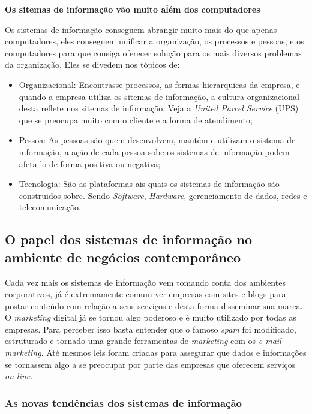 \documentclass[
	12pt,				%
	openany,			%
	a4paper,			%
	chapter=TITLE,		%
	section=TITLE,		%
	english,
	brazil				%
]{abntex2}
\begin{document}
\textbf{Os sitemas de informação vão muito aĺém dos computadores}

Os sistemas de informação conseguem abrangir muito mais do que apenas computadores, eles conseguem unificar a organização, os processos e pessoas, e os computadores para que consiga oferecer solução para os mais diversos problemas da organização.
Eles se divedem nos tópicos de:
	\begin{itemize}
		\item Organizacional: Encontrasse processos, as formas hierarquicas da empresa, e quando a empresa utiliza os sitemas de informação, a cultura organizacional desta reflete nos sitemas de informação. Veja a \textit{United Parcel Service} (UPS) que se preocupa muito com o cliente e a forma de atendimento;
		\item Pessoa: As pessoas são quem desenvolvem, mantém e utilizam o sistema de informação, a ação de cada pessoa sobe os sistemas de informação podem afeta-lo de forma positiva ou negativa;
		\item Tecnologia: São as plataformas ais quais os sistemas de informação são construidos sobre. Sendo \textit{Software}, \textit{Hardware}, gerenciamento de dados, redes e telecomunicação.
	\end{itemize}

\subsection{O papel dos sistemas de informação no ambiente de negócios contemporâneo}

Cada vez mais os sistemas de informação vem tomando conta dos ambientes corporativos, já é extremamente comum ver empresas com sites e blogs para postar conteúdo com relação a seus serviços e desta forma disseminar sua marca. O \textit{marketing} digital já se tornou algo poderoso e é muito utilizado por todas as empresas. Para perceber isso basta entender que o famoso \textit{spam} foi modificado, estruturado e tornado uma grande ferramentas de \textit{marketing} com os \textit{e-mail marketing}. Até mesmos leis foram criadas para assegurar que dados e informações se tornassem algo a se preocupar por parte das empresas que oferecem serviços \textit{on-line}.

\subsubsection{As novas tendências dos sistemas de informação}
\end{document}
